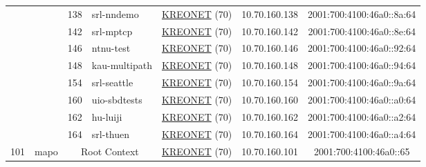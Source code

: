 \begin{small}
\begin{center}
\begin{longtable}{|c|c|c|c|c|c|c|c|}
  &  & \tiny{138} & \multicolumn{1}{|l|}{\tiny{srl-nndemo}} & \multicolumn{2}{|c|}{\tiny{\href{http://www.kreonet.net}{KREONET} (70)}} & \tiny{10.70.160.138} & \tiny{2001:700:4100:46a0::8a:64} \\* \cline{3-3}\cline{4-4}\cline{5-5}\cline{6-6}\cline{7-7}\cline{8-8}
  &  & \tiny{142} & \multicolumn{1}{|l|}{\tiny{srl-mptcp}} & \multicolumn{2}{|c|}{\tiny{\href{http://www.kreonet.net}{KREONET} (70)}} & \tiny{10.70.160.142} & \tiny{2001:700:4100:46a0::8e:64} \\* \cline{3-3}\cline{4-4}\cline{5-5}\cline{6-6}\cline{7-7}\cline{8-8}
  &  & \tiny{146} & \multicolumn{1}{|l|}{\tiny{ntnu-test}} & \multicolumn{2}{|c|}{\tiny{\href{http://www.kreonet.net}{KREONET} (70)}} & \tiny{10.70.160.146} & \tiny{2001:700:4100:46a0::92:64} \\* \cline{3-3}\cline{4-4}\cline{5-5}\cline{6-6}\cline{7-7}\cline{8-8}
  &  & \tiny{148} & \multicolumn{1}{|l|}{\tiny{kau-multipath}} & \multicolumn{2}{|c|}{\tiny{\href{http://www.kreonet.net}{KREONET} (70)}} & \tiny{10.70.160.148} & \tiny{2001:700:4100:46a0::94:64} \\* \cline{3-3}\cline{4-4}\cline{5-5}\cline{6-6}\cline{7-7}\cline{8-8}
  &  & \tiny{154} & \multicolumn{1}{|l|}{\tiny{srl-seattle}} & \multicolumn{2}{|c|}{\tiny{\href{http://www.kreonet.net}{KREONET} (70)}} & \tiny{10.70.160.154} & \tiny{2001:700:4100:46a0::9a:64} \\* \cline{3-3}\cline{4-4}\cline{5-5}\cline{6-6}\cline{7-7}\cline{8-8}
  &  & \tiny{160} & \multicolumn{1}{|l|}{\tiny{uio-sbdtests}} & \multicolumn{2}{|c|}{\tiny{\href{http://www.kreonet.net}{KREONET} (70)}} & \tiny{10.70.160.160} & \tiny{2001:700:4100:46a0::a0:64} \\* \cline{3-3}\cline{4-4}\cline{5-5}\cline{6-6}\cline{7-7}\cline{8-8}
  &  & \tiny{162} & \multicolumn{1}{|l|}{\tiny{hu-luiji}} & \multicolumn{2}{|c|}{\tiny{\href{http://www.kreonet.net}{KREONET} (70)}} & \tiny{10.70.160.162} & \tiny{2001:700:4100:46a0::a2:64} \\* \cline{3-3}\cline{4-4}\cline{5-5}\cline{6-6}\cline{7-7}\cline{8-8}
  &  & \tiny{164} & \multicolumn{1}{|l|}{\tiny{srl-thuen}} & \multicolumn{2}{|c|}{\tiny{\href{http://www.kreonet.net}{KREONET} (70)}} & \tiny{10.70.160.164} & \tiny{2001:700:4100:46a0::a4:64} \\ \hline
 \multirow{15}{*}{\tiny{101}} & \multicolumn{1}{|l|}{\multirow{15}{*}{\tiny{mapo}}} & \multicolumn{2}{|c|}{\tiny{Root Context}} & \multicolumn{2}{|c|}{\tiny{\href{http://www.kreonet.net}{KREONET} (70)}} & \tiny{10.70.160.101} & \tiny{2001:700:4100:46a0::65} \\* \cline{3-3}\cline{4-4}\cline{5-5}\cline{6-6}\cline{7-7}\cline{8-8}

\end{longtable}
\end{center}
\end{small}
